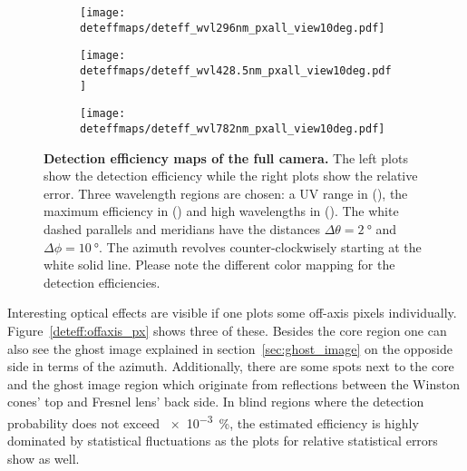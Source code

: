\begin{figure}[H]
	\centering
	\begin{subfigure}[t]{0.705\textwidth}
		\texttt{[image: deteffmaps/deteff\_wvl296nm\_pxall\_view10deg.pdf]}
		\label{deteff:full_cam:1}
	\end{subfigure}
	\hfill
	\begin{subfigure}[t]{0.705\textwidth}
		\texttt{[image: deteffmaps/deteff\_wvl428.5nm\_pxall\_view10deg.pdf]}
		\label{deteff:full_cam:2}
	\end{subfigure}
	\vfill
	\begin{subfigure}[t]{0.705\textwidth}
		\texttt{[image: deteffmaps/deteff\_wvl782nm\_pxall\_view10deg.pdf]}
		\label{deteff:full_cam:3}
	\end{subfigure}
	\caption[Detection efficiency maps of the full camera]{\textbf{Detection efficiency maps of the full camera.} The left plots show the detection efficiency while the right plots show the relative error. Three wavelength regions are chosen: a UV range in (), the maximum efficiency in () and high wavelengths in (). The white dashed parallels and meridians have the distances $\Delta\theta=\SI{2}{\degree}$ and $\Delta\phi=\SI{10}{\degree}$. The azimuth revolves counter-clockwisely starting at the white solid line. Please note the different color mapping for the detection efficiencies.}
	\label{deteff:full_cam}		
\end{figure}

Interesting optical effects are visible if one plots some off-axis pixels individually. Figure~\ref{deteff:offaxis_px} shows three of these. Besides the core region one can also see the ghost image explained in section~\ref{sec:ghost_image} on the opposide side in terms of the azimuth. Additionally, there are some spots next to the core and the ghost image region which originate from reflections between the Winston cones' top and Fresnel lens' back side. In blind regions where the detection probability does not exceed \SI{e-3}{\percent}, the estimated efficiency is highly dominated by statistical fluctuations as the plots for relative statistical errors show as well.\\

